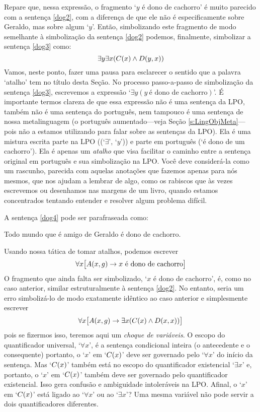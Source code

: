 Repare que, nessa expressão, o fragmento `$y$ é dono de cachorro' é muito parecido com a sentença \ref{dog2}, com a diferença de que ele não é especificamente sobre Geraldo, mas sobre algum `$y$'.
Então, simbolizando este fragmento de modo semelhante à simbolização da sentença \ref{dog2} podemos, finalmente, simbolizar a sentença \ref{dog3} como:
$$\exists y \exists x(\mathord{C}(x) \wedge \mathord{D}(y,x))$$
Vamos, neste ponto, fazer uma pausa para esclarecer o sentido que a palavra `atalho' tem no título desta Seção.
No processo passo-a-passo de simbolização da sentença \ref{dog3}, escrevemos a expressão `$\exists y(y\ \text{é dono de cachorro})$'.
É importante termos clareza de que essa expressão não é uma sentença da LPO, também não é uma sentença do português, nem tampouco é uma sentença de nossa metalinguagem (o português aumentado---veja Seção \ref{s:LingObjMeta}---pois não a estamos utilizando para falar sobre as sentenças da LPO).
Ela é uma mistura escrita parte na LPO ((`$\exists$', `$y$')) e parte em português (`é dono de um cachorro').
Ela é apenas um  \emph{atalho} que visa facilitar o caminho entre a sentença original em português e sua simbolização na LPO.
Você deve considerá-la como um rascunho, parecida com aquelas anotações que fazemos apenas para nós mesmos, que nos ajudam a lembrar de algo, como os rabiscos que às vezes escrevemos ou desenhamos nas margens de um livro, quando estamos concentrados tentando entender e resolver algum problema difícil.

A sentença \ref{dog4} pode ser parafraseada como:
\begin{center}
	Todo mundo que é amigo de Geraldo é dono de cachorro.
\end{center}
Usando nossa tática de tomar atalhos, podemos escrever
$$\forall x \bigl[\mathord{A}(x,g) \rightarrow x \text{ é dono de cachorro}\bigr]$$
O fragmento que ainda falta ser simbolizado, `$x$ é dono de cachorro', é, como no caso anterior, similar estruturalmente à sentença \ref{dog2}.
No entanto, seria um erro simbolizá-lo de modo exatamente idêntico ao caso anterior e simplesmente escrever
$$\forall x \bigl[\mathord{A}(x,g) \rightarrow \exists x(\mathord{C}(x) \wedge \mathord{D}(x,x))\bigr]$$
pois se fizermos isso, teremos aqui um \emph{choque de variáveis}.
O escopo do quantificador universal, `$\forall x$', é a sentença condicional inteira (o antecedente e o consequente) portanto, o `$x$' em `$\mathord{C}(x)$' deve ser governado pelo `$\forall x$' do início da sentença.
Mas `$\mathord{C}(x)$' também está no escopo do quantificador existencial `$\exists x$' e, portanto, o `$x$' em `$\mathord{C}(x)$' também deve ser governado pelo quantificador existencial.
Isso gera confusão e ambiguidade intoleráveis na LPO.
Afinal, o `$x$' em `$\mathord{C}(x)$' está ligado ao `$\forall x$' ou ao `$\exists x$'?
Uma mesma variável não pode servir a dois quantificadores diferentes.

